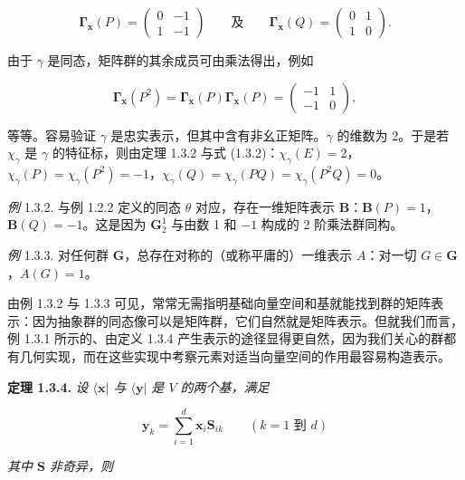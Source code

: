 \begin{equation*}
\mathbf{\Gamma}_{\mathbf{x}}(P) = \begin{pmatrix} 0 & -1 \\ 1 & -1 \end{pmatrix} \qquad
\text{及} \qquad \mathbf{\Gamma}_{\mathbf{x}}(Q) = \begin{pmatrix} 0 & 1 \\ 1 & 0 \end{pmatrix}.
\tag{1.3.2}
\end{equation*}

由于 $\gamma$ 是同态，矩阵群的其余成员可由乘法得出，例如

\begin{equation*}
\mathbf{\Gamma}_{\mathbf{x}}(P^{2}) = \mathbf{\Gamma}_{\mathbf{x}}(P)\mathbf{\Gamma}_{\mathbf{x}}(P) = \begin{pmatrix} -1 & 1 \\ -1 & 0 \end{pmatrix},
\tag{1.3.3}
\end{equation*}

等等。容易验证 $\gamma$ 是忠实表示，但其中含有非幺正矩阵。$\gamma$ 的维数为 2。于是若 $\chi_{\gamma}$ 是 $\gamma$ 的特征标，则由定理 1.3.2 与式 (1.3.2)：$\chi_{\gamma}(E) = 2$，$\chi_{\gamma}(P) = \chi_{\gamma}(P^{2}) = -1$，$\chi_{\gamma}(Q) = \chi_{\gamma}(PQ) = \chi_{\gamma}(P^{2}Q) = 0$。

\textit{例} 1.3.2. 与例 1.2.2 定义的同态 $\theta$ 对应，存在一维矩阵表示 $\mathbf{B}$：$\mathbf{B}(P) = 1$，$\mathbf{B}(Q) = -1$。这是因为 $\mathbf{G}_2^1$ 与由数 1 和 $-1$ 构成的 2 阶乘法群同构。

\textit{例} 1.3.3. 对任何群 $\mathbf{G}$，总存在对称的（或称平庸的）一维表示 $A$：对一切 $G \in \mathbf{G}$，$A(G) = 1$。

由例 1.3.2 与 1.3.3 可见，常常无需指明基础向量空间和基就能找到群的矩阵表示：因为抽象群的同态像可以是矩阵群，它们自然就是矩阵表示。但就我们而言，例 1.3.1 所示的、由定义 1.3.4 产生表示的途径显得更自然，因为我们关心的群都有几何实现，而在这些实现中考察元素对适当向量空间的作用最容易构造表示。

\textbf{定理 1.3.4.} \textit{设 $\langle \mathbf{x}|$ 与 $\langle \mathbf{y}|$ 是 $V$ 的两个基，满足}

\begin{equation*}
\mathbf{y}_{k} = \sum_{i=1}^{d} \mathbf{x}_{i}\mathbf{S}_{ik} \qquad (k = 1 \text{ 到 } d)
\tag{1.3.4}
\end{equation*}

\textit{其中 $\mathbf{S}$ 非奇异，则}

